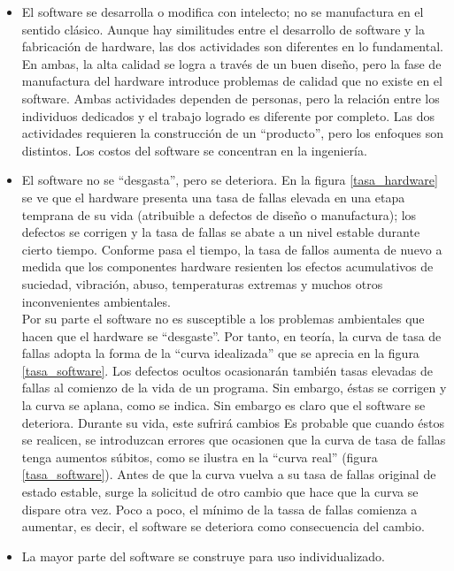 \documentclass{article}
\begin{document}
\begin{itemize}
\item El software se desarrolla o modifica con intelecto; no se manufactura en el sentido clásico. Aunque hay similitudes entre el desarrollo de software y la fabricación de hardware, las dos actividades son diferentes en lo fundamental. En ambas, la alta calidad se logra a través de un buen diseño, pero la fase de manufactura del hardware introduce problemas de calidad que no existe en el software. Ambas actividades dependen de personas, pero la relación entre los individuos dedicados y el trabajo logrado es diferente por completo. Las dos actividades requieren la construcción de un ``producto'', pero los enfoques son distintos. Los costos del software se concentran en la ingeniería.

\item El software no se ``desgasta'', pero se deteriora. En la figura \ref{tasa_hardware} se ve que el hardware presenta una tasa de fallas elevada en una etapa temprana de su vida (atribuible a defectos de diseño o manufactura); los defectos se corrigen y la tasa de fallas se abate a un nivel estable durante cierto tiempo. Conforme pasa el tiempo, la tasa de fallos aumenta de nuevo a medida que los componentes hardware resienten los efectos acumulativos de suciedad, vibración, abuso, temperaturas extremas y muchos otros inconvenientes ambientales. \\

Por su parte el software no es susceptible a los problemas ambientales que hacen que el hardware se ``desgaste''. Por tanto, en teoría, la curva de tasa de fallas adopta la forma de la ``curva idealizada'' que se aprecia en la figura \ref{tasa_software}. Los defectos ocultos ocasionarán también tasas elevadas de fallas al comienzo de la vida de un programa. Sin embargo, éstas se corrigen y la curva se aplana, como se indica. Sin embargo es claro que el software se deteriora. Durante su vida, este sufrirá cambios Es probable que cuando éstos se realicen, se introduzcan errores que ocasionen que la curva de tasa de fallas tenga aumentos súbitos, como se ilustra en la ``curva real'' (figura \ref{tasa_software}). Antes de que la curva vuelva a su tasa de fallas original de estado estable, surge la solicitud de otro cambio que hace que la curva se dispare otra vez. Poco a poco, el mínimo de la tassa de fallas comienza a aumentar, es decir, el software se deteriora como consecuencia del cambio.

\item La mayor parte del software se construye para uso individualizado.
\end{itemize}
\end{document}
